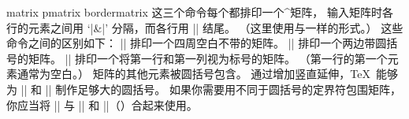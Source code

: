 \begindesc
\cts matrix
   {{\bt {}}}
\cts pmatrix
   {{\bt {}}}
\cts bordermatrix
   {{\bt {}}}
\explain
这三个命令每个都排印一个^{矩阵}，
输入矩阵时各行的元素之间用 `|&|' 分隔，而各行用 |\cr| 结尾。%
（这里使用与一样的形式。）%
这些命令之间的区别如下：
\ulist\compact
\li |\matrix| 排印一个四周空白不带的矩阵。
\li |\pmatrix| 排印一个两边带圆括号的矩阵。
\li |\bordermatrix| 排印一个将第一行和第一列视为标号的矩阵。%
（第一行的第一个元素通常为空白。）%
矩阵的其他元素被圆括号包含。
\endulist
通过增加竖直延伸，\TeX\ 能够为 |\pmatrix| 和 |\bordermatrix| 制作足够大的圆括号。
如果你需要用不同于圆括号的定界符包围矩阵，你应当将
|\matrix| 与 |\left| 和 |\right|（\xref\left ）合起来使用。

